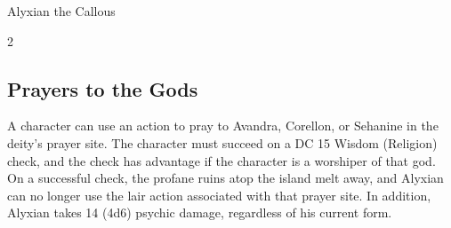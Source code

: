 \documentclass[10pt,a4paper,twoside,bg=print,twocolumn,openany,nodeprecatedcode]{dndbook}
\begin{document}
\begin{DndMonster}[float*=b,width=\textwidth + 8pt]{Alyxian the Callous}
\begin{multicols}{2}
\begin{description}
\end{description}

\subsection{Prayers to the Gods}
A character can use an action to pray to Avandra, Corellon, or Sehanine in the deity's prayer site. The character must succeed on a DC 15 Wisdom (Religion) check, and the check has advantage if the character is a worshiper of that god. On a successful check, the profane ruins atop the island melt away, and Alyxian can no longer use the lair action associated with that prayer site. In addition, Alyxian takes 14 (4d6) psychic damage, regardless of his current form.

\end{multicols}
\end{DndMonster}
\end{document}
